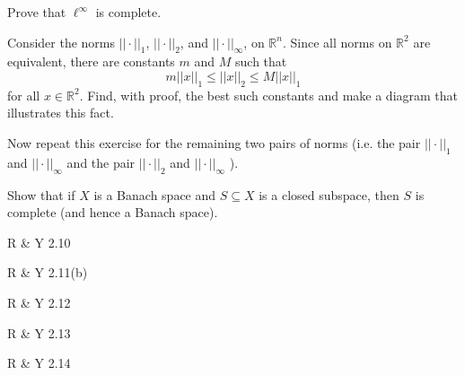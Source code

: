 \documentclass[minion]{homework}
\newcommand{\Reals}{\mathbb{R}}
\begin{document}
\begin{aproblems}

\hproblem Prove that $\ell^\infty$ is complete.

\hproblem Consider the norms $||\cdot||_1$, $||\cdot||_2$, and
$||\cdot||_\infty$, on $\Reals^n$.  Since all norms on $\Reals^2$
are equivalent, there are constants $m$ and $M$ such that
\[
m||x||_1 \le ||x||_2 \le M||x||_1
\]
for all $x\in\Reals^2$.  Find, with proof, the best such constants
and make a diagram that illustrates this fact.  

Now repeat this exercise for the remaining two pairs of norms 
(i.e. the pair $||\cdot||_1$ and $||\cdot||_\infty$ and the pair
$||\cdot||_2$ and $||\cdot||_\infty$ ).

\hproblem Show that if $X$ is a Banach space and $S\subseteq X$ is a
closed subspace, then $S$ is complete (and hence a Banach space).

\hproblem R \& Y 2.10

\hproblem R \& Y 2.11(b)

\hproblem R \& Y 2.12

\hproblem R \& Y 2.13

\hproblem R \& Y 2.14

\end{aproblems}
\end{document}
